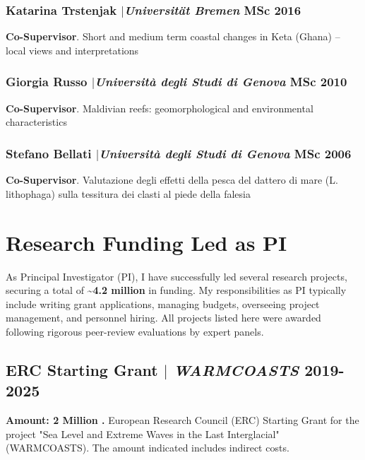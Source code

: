 \documentclass[11pt]{article}
\begin{document}
\smallskip

\subsubsection{Katarina Trstenjak $|${\normalfont\textit{Universität Bremen}} \hfill MSc 2016}
{\footnotesize 
\textbf{Co-Supervisor}. Short and medium term coastal changes in Keta (Ghana) – local views and interpretations}

\smallskip

\subsubsection{Giorgia Russo $|${\normalfont\textit{Università degli Studi di Genova}} \hfill MSc 2010}
{\footnotesize 
\textbf{Co-Supervisor}. Maldivian reefs: geomorphological and environmental characteristics}
\smallskip

\subsubsection{Stefano Bellati $|${\normalfont\textit{Università degli Studi di Genova}} \hfill MSc 2006}
{\footnotesize 
\textbf{Co-Supervisor}. Valutazione degli effetti della pesca del dattero di mare (L. lithophaga) sulla tessitura dei clasti al piede della falesia}

\newpage

\section{Research Funding Led as PI}
{\normalfont As Principal Investigator (PI), I have successfully led several research projects, securing a total of  \textbf{\textasciitilde4.2 million \texteuro} in funding. My responsibilities as PI typically include writing grant applications, managing budgets, overseeing project management, and personnel hiring. All projects listed here were awarded following rigorous peer-review evaluations by expert panels.}\\

\bigskip

\subsection{ERC Starting Grant $|$ {\normalfont\textit{WARMCOASTS}} \hfill 2019-2025}
{\footnotesize \textbf{Amount: 2 Million \texteuro.} European Research Council (ERC) Starting Grant for the project "Sea Level and Extreme Waves in the Last Interglacial" (WARMCOASTS). The amount indicated includes indirect costs.}
\bigskip
\end{document}
